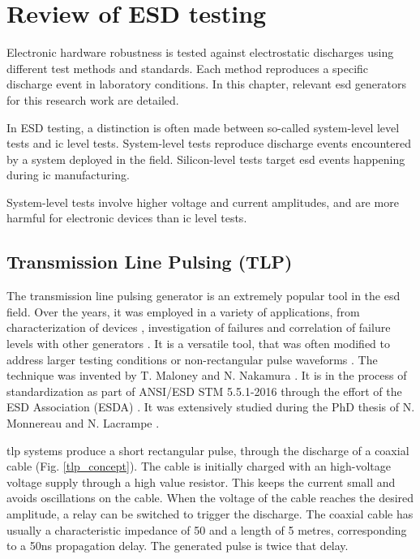 \section{Review of ESD testing}
\label{sec:state-art-esd-testing}

Electronic hardware robustness is tested against electrostatic discharges using different test methods and standards.
Each method reproduces a specific discharge event in laboratory conditions.
In this chapter, relevant \gls{esd} generators for this research work are detailed.

In ESD testing, a distinction is often made between so-called system-level level tests and \gls{ic} level tests.
System-level tests reproduce discharge events encountered by a system deployed in the field.
Silicon-level tests target \gls{esd} events happening during \gls{ic} manufacturing.

System-level tests involve higher voltage and current amplitudes, and are more harmful for electronic devices than \gls{ic} level tests.

\subsection{Transmission Line Pulsing (TLP)}

The transmission line pulsing generator is an extremely popular tool in the \gls{esd} field.
Over the years, it was employed in a variety of applications, from characterization of devices \cite{TLPforESDProtectionCz, TLPthroubleshooting}, investigation of failures \cite{tlp-application-1, tlp-application-2} and correlation of failure levels with other generators \cite{correlation-system-level-esd-tlp}.
It is a versatile tool, that was often modified to address larger testing conditions \cite{tlp-power} or non-rectangular pulse waveforms \cite{tlp-based-hmm, my-publi-tlp-hmm}.
The technique was invented by T. Maloney and N. Nakamura \cite{TLP}.
It is in the process of standardization as part of ANSI/ESD STM 5.5.1-2016 \cite{tlp-standard} through the effort of the ESD Association (ESDA) \cite{esda}.
It was extensively studied during the PhD thesis of N. Monnereau \cite{phd-monnereau} and N. Lacrampe \cite{phd-lacrampe}.

\gls{tlp} systems produce a short rectangular pulse, through the discharge of a coaxial cable (Fig. \ref{tlp_concept}).
The cable is initially charged with an high-voltage voltage supply through a high value resistor.
This keeps the current small and avoids oscillations on the cable.
When the voltage of the cable reaches the desired amplitude, a relay can be switched to trigger the discharge.
The coaxial cable has usually a characteristic impedance of 50\textOmega{} and a length of 5 metres, corresponding to a 50ns propagation delay.
The generated pulse is twice that delay.

